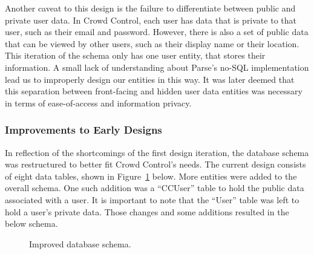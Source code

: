 Another caveat to this design is the failure to differentiate between public and private user data. In Crowd Control, each user has data that is private to that user, such as their email and password. However, there is also a set of public data that can be viewed by other users, such as their display name or their location. This iteration of the schema only has one user entity, that stores their information. A small lack of understanding about Parse's no-SQL implementation lead us to improperly design our entities in this way. It was later deemed that this separation between front-facing and hidden user data entities was necessary in terms of ease-of-access and information privacy.

\subsubsection{Improvements to Early Designs}
In reflection of the shortcomings of the first design iteration, the database schema was restructured to better fit Crowd Control's needs. The current design consists of eight data tables,  shown in Figure~\ref{MidDBSchema} below. More entities were added to the overall schema. One such addition was a ``CCUser'' table to hold the public data associated with a user. It is important to note that the ``User'' table was left to hold a user's private data. Those changes and some additions resulted in the below schema. 

	\begin{figure}[tbh!]
	\begin{center}
	\end{center}
	\caption{Improved database schema. \label{MidDBSchema}}
	\end{figure}


